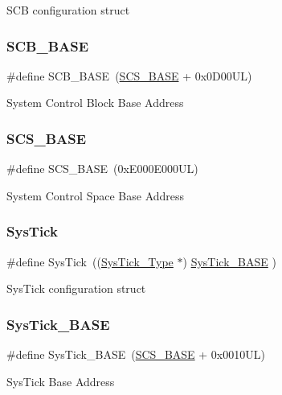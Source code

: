 S\+CB configuration struct \mbox{\label{group___c_m_s_i_s__core__base_gad55a7ddb8d4b2398b0c1cfec76c0d9fd}} 
\subsubsection{\texorpdfstring{SCB\_BASE}{SCB\_BASE}}
{\footnotesize\ttfamily \#define S\+C\+B\+\_\+\+B\+A\+SE~(\mbox{\hyperlink{group___c_m_s_i_s__core__base_ga3c14ed93192c8d9143322bbf77ebf770}{S\+C\+S\+\_\+\+B\+A\+SE}} +  0x0\+D00\+U\+L)}

System Control Block Base Address \mbox{\label{group___c_m_s_i_s__core__base_ga3c14ed93192c8d9143322bbf77ebf770}} 
\subsubsection{\texorpdfstring{SCS\_BASE}{SCS\_BASE}}
{\footnotesize\ttfamily \#define S\+C\+S\+\_\+\+B\+A\+SE~(0x\+E000\+E000\+U\+L)}

System Control Space Base Address \mbox{\label{group___c_m_s_i_s__core__base_gacd96c53beeaff8f603fcda425eb295de}} 
\subsubsection{\texorpdfstring{SysTick}{SysTick}}
{\footnotesize\ttfamily \#define Sys\+Tick~((\mbox{\hyperlink{struct_sys_tick___type}{Sys\+Tick\+\_\+\+Type}}   $\ast$)     \mbox{\hyperlink{group___c_m_s_i_s__core__base_ga58effaac0b93006b756d33209e814646}{Sys\+Tick\+\_\+\+B\+A\+SE}}  )}

Sys\+Tick configuration struct \mbox{\label{group___c_m_s_i_s__core__base_ga58effaac0b93006b756d33209e814646}} 
\subsubsection{\texorpdfstring{SysTick\_BASE}{SysTick\_BASE}}
{\footnotesize\ttfamily \#define Sys\+Tick\+\_\+\+B\+A\+SE~(\mbox{\hyperlink{group___c_m_s_i_s__core__base_ga3c14ed93192c8d9143322bbf77ebf770}{S\+C\+S\+\_\+\+B\+A\+SE}} +  0x0010\+U\+L)}

Sys\+Tick Base Address 